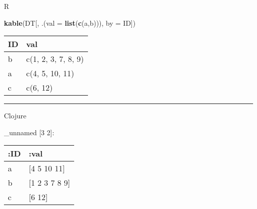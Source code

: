 \documentclass[]{article}
\newenvironment{Shaded}{\begin{snugshade}}{\end{snugshade}}
\newcommand{\KeywordTok}[1]{\textcolor[rgb]{0.13,0.29,0.53}{\textbf{#1}}}
\newcommand{\DataTypeTok}[1]{\textcolor[rgb]{0.13,0.29,0.53}{#1}}
\newcommand{\AttributeTok}[1]{\textcolor[rgb]{0.77,0.63,0.00}{#1}}
\newcommand{\NormalTok}[1]{#1}
\begin{document}
R

\begin{Shaded}
\begin{Highlighting}[]
\KeywordTok{kable}\NormalTok{(DT[, .(}\DataTypeTok{val =} \KeywordTok{list}\NormalTok{(}\KeywordTok{c}\NormalTok{(a,b))), }\DataTypeTok{by =}\NormalTok{ ID])}
\end{Highlighting}
\end{Shaded}

\begin{longtable}[]{@{}ll@{}}
\toprule
ID & val\tabularnewline
\midrule
\endhead
b & c(1, 2, 3, 7, 8, 9)\tabularnewline
a & c(4, 5, 10, 11)\tabularnewline
c & c(6, 12)\tabularnewline
\bottomrule
\end{longtable}

\begin{center}\rule{0.5\linewidth}{0.5pt}\end{center}

Clojure

\begin{Shaded}
\end{Shaded}

\_unnamed {[}3 2{]}:

\begin{longtable}[]{@{}ll@{}}
\toprule
:ID & :val\tabularnewline
\midrule
\endhead
a & {[}4 5 10 11{]}\tabularnewline
b & {[}1 2 3 7 8 9{]}\tabularnewline
c & {[}6 12{]}\tabularnewline
\bottomrule
\end{longtable}
\end{document}
